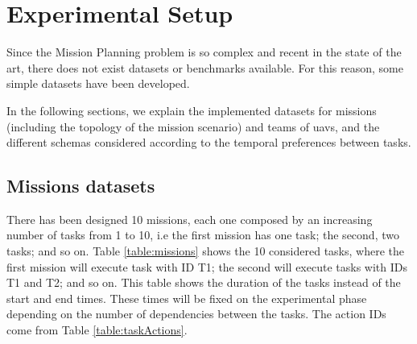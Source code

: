 
\chapter{Experimental Setup} %
\label{Chapter4}

Since the Mission Planning problem is so complex and recent in the state of the art, there does not exist datasets or benchmarks available. For this reason, some simple datasets have been developed.

In the following sections, we explain the implemented datasets for missions (including the topology of the mission scenario) and teams of \glspl{uav}, and the different schemas considered according to the temporal preferences between tasks.

\section{Missions datasets}
There has been designed 10 missions, each one composed by an increasing number of tasks from 1 to 10, i.e the first mission has one task; the second, two tasks; and so on. Table \ref{table:missions} shows the 10 considered tasks, where the first mission will execute task with ID T1; the second will execute tasks with IDs T1 and T2; and so on. This table shows the duration of the tasks instead of the start and end times. These times will be fixed on the experimental phase depending on the number of dependencies between the tasks. The action IDs come from Table \ref{table:taskActions}.

